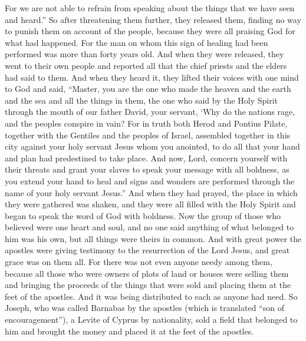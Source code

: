 \begin{biblechapter}
\verse For we are not able to refrain from speaking about the things that we have seen and heard.”
\verse So after threatening them further, they released them, finding no way to punish them on account of the people, because they were all praising God for what had happened.
\verse For the man on whom this sign of healing had been performed was more than forty years old.
 And when they were released, they went to their own people and reported all that the chief priests and the elders had said to them.
\verse And when they heard it, they lifted their voices with one mind to God and said, “Master, you are the one who made the heaven and the earth and the sea and all the things in them,
\verse the one who said by the Holy Spirit through the mouth of our father David, your servant,
\verse ‘Why do the nations rage, 
and the peoples conspire in vain?
\verse For in truth both Herod and Pontius Pilate, together with the Gentiles and the peoples of Israel, assembled together in this city against your holy servant Jesus whom you anointed,
\verse to do all that your hand and plan had predestined to take place.
\verse And now, Lord, concern yourself with their threats and grant your slaves to speak your message with all boldness,
\verse as you extend your hand to heal and signs and wonders are performed through the name of your holy servant Jesus.”
\verse And when they had prayed, the place in which they were gathered was shaken, and they were all filled with the Holy Spirit and began to speak the word of God with boldness.
 Now the group of those who believed were one heart and soul, and no one said anything of what belonged to him was his own, but all things were theirs in common.
\verse And with great power the apostles were giving testimony to the resurrection of the Lord Jesus, and great grace was on them all.
\verse For there was not even anyone needy among them, because all those who were owners of plots of land or houses were selling them and bringing the proceeds of the things that were sold
\verse and placing them at the feet of the apostles. And it was being distributed to each as anyone had need.
\verse So Joseph, who was called Barnabas by the apostles (which is translated “son of encouragement”), a Levite of Cyprus by nationality,
\verse sold a field that belonged to him and brought the money and placed it at the feet of the apostles.
\end{biblechapter}


